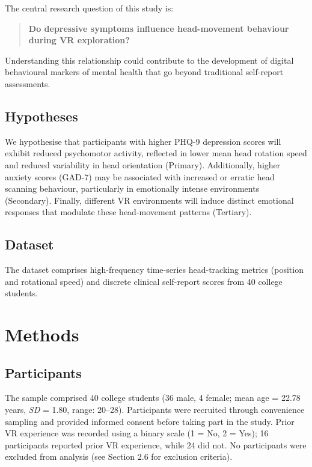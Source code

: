 \documentclass[12pt]{article}
\begin{document}
The central research question of this study is:

\begin{quote}
\textbf{Do depressive symptoms influence head-movement behaviour during VR exploration?}
\end{quote}

Understanding this relationship could contribute to the development of digital behavioural markers of mental health that go beyond traditional self-report assessments.

\subsection{Hypotheses}
We hypothesise that participants with higher PHQ-9 depression scores will exhibit reduced psychomotor activity, reflected in lower mean head rotation speed and reduced variability in head orientation (Primary). Additionally, higher anxiety scores (GAD-7) may be associated with increased or erratic head scanning behaviour, particularly in emotionally intense environments (Secondary). Finally, different VR environments will induce distinct emotional responses that modulate these head-movement patterns (Tertiary).

\subsection{Dataset}
The dataset comprises high-frequency time-series head-tracking metrics (position and rotational speed) and discrete clinical self-report scores from 40 college students.


\section{Methods}

\subsection{Participants}

The sample comprised 40 college students (36 male, 4 female; mean age = 22.78 years, \emph{SD} = 1.80, range: 20--28). Participants were recruited through convenience sampling and provided informed consent before taking part in the study. Prior VR experience was recorded using a binary scale (1 = No, 2 = Yes); 16 participants reported prior VR experience, while 24 did not. No participants were excluded from analysis (see Section 2.6 for exclusion criteria).
\end{document}
